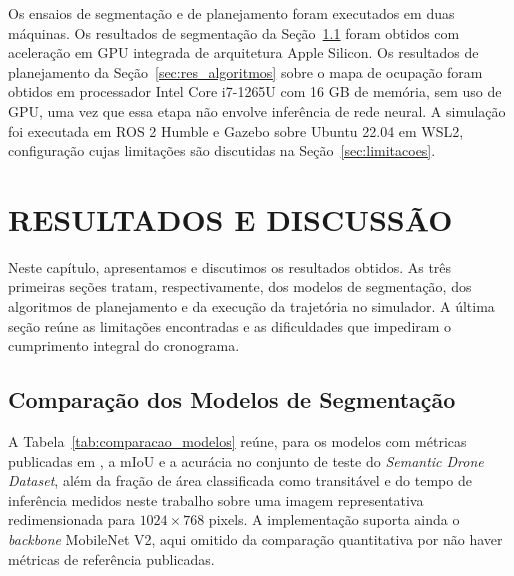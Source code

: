 \documentclass[
    12pt,
    openright,
    oneside,
    a4paper,
    english,
    brazil
]{abntex2}
\begin{document}
Os ensaios de segmentação e de planejamento foram executados em duas máquinas. Os resultados de segmentação da Seção~\ref{sec:res_segmentacao} foram obtidos com aceleração em GPU integrada de arquitetura Apple Silicon. Os resultados de planejamento da Seção~\ref{sec:res_algoritmos} sobre o mapa de ocupação foram obtidos em processador Intel Core i7-1265U com 16 GB de memória, sem uso de GPU, uma vez que essa etapa não envolve inferência de rede neural. A simulação foi executada em ROS 2 Humble e Gazebo sobre Ubuntu 22.04 em WSL2, configuração cujas limitações são discutidas na Seção~\ref{sec:limitacoes}.

\chapter{RESULTADOS E DISCUSSÃO}
\label{cap:resultados}

Neste capítulo, apresentamos e discutimos os resultados obtidos. As três primeiras seções tratam, respectivamente, dos modelos de segmentação, dos algoritmos de planejamento e da execução da trajetória no simulador. A última seção reúne as limitações encontradas e as dificuldades que impediram o cumprimento integral do cronograma.

\section{Comparação dos Modelos de Segmentação}
\label{sec:res_segmentacao}

A Tabela~\ref{tab:comparacao_modelos} reúne, para os modelos com métricas publicadas em \cite{junior2024_models}, a mIoU e a acurácia no conjunto de teste do \emph{Semantic Drone Dataset}, além da fração de área classificada como transitável e do tempo de inferência medidos neste trabalho sobre uma imagem representativa redimensionada para $1024 \times 768$ pixels. A implementação suporta ainda o \textit{backbone} MobileNet V2, aqui omitido da comparação quantitativa por não haver métricas de referência publicadas.
\end{document}
